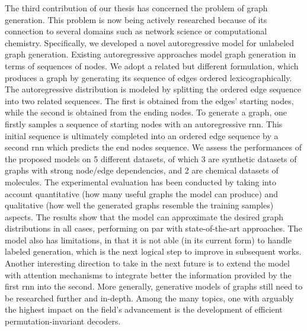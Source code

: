 The third contribution of our thesis has concerned the problem of graph generation. This problem is now being actively researched because of its connection to several domains such as network science or computational chemistry. Specifically, we developed a novel autoregressive model for unlabeled graph generation. Existing autoregressive approaches model graph generation in terms of sequences of nodes. We adopt a related but different formulation, which produces a graph by generating its sequence of edges ordered lexicographically. The autoregressive distribution is modeled by splitting the ordered edge sequence into two related sequences. The first is obtained from the edges' starting nodes, while the second is obtained from the ending nodes. To generate a graph, one firstly samples a sequence of starting nodes with an autoregressive \gls{rnn}. This initial sequence is ultimately completed into an ordered edge sequence by a second \gls{rnn} which predicts the end nodes sequence. We assess the performances of the proposed models on 5 different datasets, of which 3 are synthetic datasets of graphs with strong node/edge dependencies, and 2 are chemical datasets of molecules. The experimental evaluation has been conducted by taking into account quantitative (\ie how many useful graphs the model can produce) and qualitative (\ie how well the generated graphs resemble the training samples) aspects. The results show that the model can approximate the desired graph distributions in all cases, performing on par with state-of-the-art approaches. The model also has limitations, in that it is not able (in its current form) to handle labeled generation, which is the next logical step to improve in subsequent works. Another interesting direction to take in the next future is to extend the model with attention mechanisms to integrate better the information provided by the first \gls{rnn} into the second. More generally, generative models of graphs still need to be researched further and in-depth. Among the many topics, one with arguably the highest impact on the field's advancement is the development of efficient permutation-invariant decoders.
\vspace{1em}

